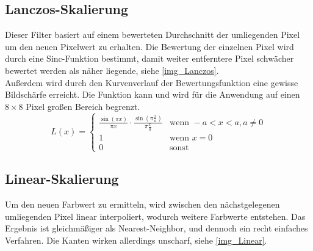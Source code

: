 \subsection{Lanczos-Skalierung}
Dieser Filter basiert auf einem bewerteten Durchschnitt der umliegenden Pixel um den neuen Pixelwert zu erhalten. Die Bewertung der einzelnen Pixel wird durch eine Sinc-Funktion bestimmt, damit weiter entferntere Pixel schwächer bewertet werden als näher liegende, siehe \autoref{img_Lanczos}.\\
Außerdem wird durch den Kurvenverlauf der Bewertungsfunktion eine gewisse Bildschärfe erreicht. Die Funktion kann und wird für die Anwendung auf einen $8\times 8$ Pixel großen Bereich begrenzt.\\
\cite{wiki_Lanczos}
\[ L(x)= \left\{ \begin{array}{ll}
\frac{\sin(\pi x)}{\pi x} \cdot \frac{\sin(\pi \frac{x}{a})}{\pi \frac{x}{a}} & \textrm{wenn } -a < x <a, a\ne 0\\
1 & \textrm{wenn } x = 0\\
0 & \textrm{sonst}
\end{array}\right. \]
\subsection{Linear-Skalierung}
Um den neuen Farbwert zu ermitteln, wird zwischen den nächstgelegenen umliegenden Pixel linear interpoliert, wodurch weitere Farbwerte entstehen. Das Ergebnis ist gleichmäßiger als Nearest-Neighbor, und dennoch ein recht einfaches Verfahren. Die Kanten wirken allerdings unscharf, siehe \autoref{img_Linear}.
